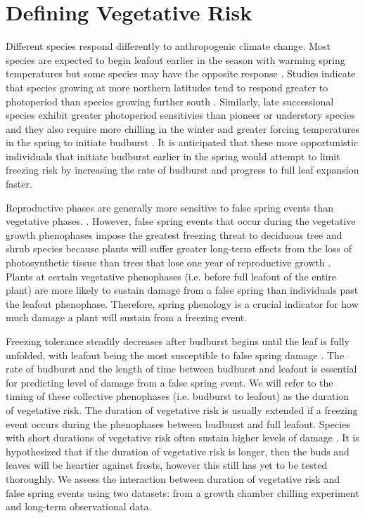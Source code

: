 \documentclass{article}\usepackage[]{graphicx}\usepackage[]{color}
\begin{document}
\section*{Defining Vegetative Risk}
Different species respond differently to anthropogenic climate change. Most species are expected to begin leafout earlier in the season with warming spring temperatures but some species may have the opposite response \citep{Cleland2006, Yu2010, Xin2016}. Studies indicate that species growing at more northern latitudes tend to respond greater to photoperiod than species growing further south \citep {Partanen2004, Viheraaarnio2006, Caffarra2011}. Similarly, late successional species exhibit greater photoperiod sensitivies than pioneer or understory species \citep{Basler2012} and they also require more chilling in the winter and greater forcing temperatures in the spring to initiate budburst \citep{Laube2013}. It is anticipated that these more opportunistic individuals that initiate budburst earlier in the spring would attempt to limit freezing risk by increasing the rate of budburst and progress to full leaf expansion faster.

Reproductive phases are generally more sensitive to false spring events than vegetative phases. \citep{Augspurger2009, Lenz2013}. However, false spring events that occur during the vegetative growth phenophases impose the greatest freezing threat to deciduous tree and shrub species because plants will suffer greater long-term effects from the loss of photosynthetic tissue than trees that lose one year of reproductive growth \citep{Sakai1987}. Plants at certain vegetative phenophases (i.e. before full leafout of the entire plant) are more likely to sustain damage from a false spring than individuals past the leafout phenophase. Therefore, spring phenology is a crucial indicator for how much damage a plant will sustain from a freezing event.

Freezing tolerance steadily decreases after budburst begins until the leaf is fully unfolded, with leafout being the most susceptible to false spring damage \citep {Lenz2016}. The rate of budburst and the length of time between budburst and leafout is essential for predicting level of damage from a false spring event. We will refer to the timing of these collective phenophases (i.e. budburst to leafout) as the duration of vegetative risk. The duration of vegetative risk is usually extended if a freezing event occurs during the phenophases between budburst and full leafout. Species with short durations of vegetative risk often sustain higher levels of damage \citep {Augspurger2009}. It is hypothesized that if the duration of vegetative risk is longer, then the buds and leaves will be heartier against frosts, however this still has yet to be tested thoroughly. We assess the interaction between duration of vegetative risk and false spring events using two datasets: from a growth chamber chilling experiment and long-term observational data.
\end{document}
